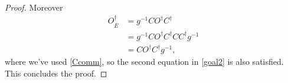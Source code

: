 \documentclass[11pt]{article}
\newcommand{\ol}{\overline}
\begin{document}
\begin{proof}
Moreover
\begin{align}\nonumber
O_{\ol{E}}^\dagger&=g^{-1}C O^\dagger C^\dagger\\\nonumber
&=g^{-1}C O^\dagger C^\dagger C C^\dagger g^{-1}\\
&=C O^\dagger C^\dagger g^{-1},
\end{align}
where we've used \eqref{Ccomm}, so the second equation in \eqref{goal2} is also satisfied.  This concludes the proof.
\end{proof}



\end{document}
